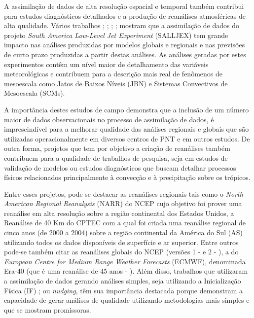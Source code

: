 A assimilação de dados de alta resolução espacial e temporal também contribui para estudos diagnósticos detalhados e a produção de reanálises atmosféricas de alta qualidade. Vários trabalhos \cite{cavalcantiherdies04}; \cite{herdiesetal06}; \cite{rozantecavalcanti07}; \cite{herdiesetal07}; \cite{skabarnicolini09} mostram que a assimilação de dados do projeto \textit{South America Low-Level Jet Experiment} (SALLJEX) tem grande impacto nas análises produzidas por modelos globais e regionais e nas previsões de curto prazo produzidas a partir destas análises. As análises geradas por estes experimentos contêm um nível maior de detalhamento das variáveis meteorológicas e contribuem para a descrição mais real de fenômenos de mesoescala como Jatos de Baixos Níveis (JBN) e Sistemas Convectivos de Mesoescala (SCMs). 

A importância destes estudos de campo demonstra que a inclusão de um número maior de dados observacionais no processo de assimilação de dados, é imprescindível para a melhorar qualidade das análises regionais e globais que são utilizadas operacionalmente em diversos centros de PNT e em outros estudos. De outra forma, projetos que tem por objetivo a criação de reanálises também contribuem para a qualidade de trabalhos de pesquisa, seja em estudos de validação de modelos ou estudos diagnósticos que buscam detalhar processos físicos relacionados principalmente à convecção e à precipitação sobre os trópicos. 

Entre esses projetos, pode-se destacar as reanálises regionais tais como o \textit{North American Regional Reanalysis} (NARR) do NCEP \cite{messingeretal06} cujo objetivo foi prover uma reanálise em alta resolução sobre a região continental dos Estados Unidos, a Reanálise de 40 Km do CPTEC \cite{aravequiaetal07} com a qual foi criada uma reanálise regional de cinco anos (de 2000 a 2004) sobre a região continental da América do Sul (AS) utilizando todos os dados disponíveis de superfície e ar superior. Entre outros pode-se também citar as reanálises globais do NCEP (versões 1 -  e 2 - ), a do \textit{European Centre for Medium Range Weather Forecasts} (ECMWF), denominada Era-40 (que é uma reanálise de 45 anos - ). Além disso, trabalhos que utilizaram a assimilação de dados gerando análises simples, seja utilizando a Inicialização Física (IF) \cite{nunescocke04}; \cite{biazettoetal05} ou \textit{nudging}, têm sua importância destacada porque demonstram a capacidade de gerar análises de qualidade utilizando metodologias mais simples e que se mostram promissoras. 

